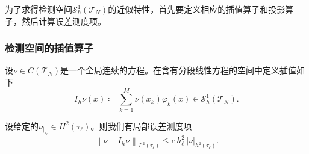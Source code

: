 为了求得检测空间$\mathcal{S}_{h}^{1}\left(\mathcal{T}_{N} \right)$的近似特性，首先要定义相应的插值算子和投影算子，然后计算误差测度项。
\subsubsection{检测空间的插值算子}
\label{sec:finele-trial-interpolation}
设$\nu \in C \left( \mathcal{T}_{N} \right)$是一个全局连续的方程。在含有分段线性方程的空间中定义插值如下
\begin{equation}
  \label{eq:finele-trial-interpolation}
  I_{h} \nu(x) \coloneqq \sum_{k=1}^{M} \nu(x_{k}) \varphi_{k}(x) \in  \mathcal{S}_{h}^{1}\left(\mathcal{T}_{N} \right).
\end{equation}

\begin{lemma}[分段线性插值的局部误差测度项]
  \label{lemma:finele-trial-interpolation-error}
  设给定的$\nu_{|_{\tau_{\ell}}} \in H^{2}\left( \tau_{\ell} \right)$。则我们有局部误差测度项
  \begin{equation}
    \label{eq:finele-trial-interpolation-error}
    \left\| \nu - I_{h} \nu \right\|_{L^{2}(\tau_{\ell})}
    \le c \, h_{\ell}^{2} \, \left| \nu \right|_{h^{2}(\tau_{\ell})}.
  \end{equation}
\end{lemma}
